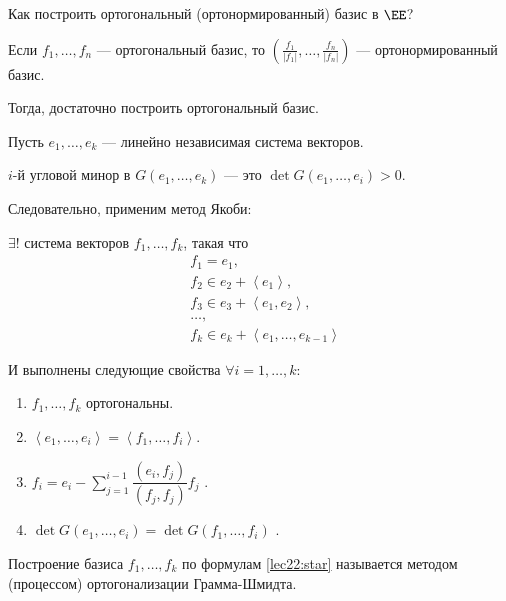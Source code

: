 Как построить ортогональный (ортонормированный) базис в $\EE$?

Если $f_1, \dots, f_n$ --- ортогональный базис, то $\left(\frac{f_1}{|f_1|}, \dots, \frac{f_n}{|f_n|}\right)$ --- ортонормированный базис.

Тогда, достаточно построить ортогональный базис.

Пусть $e_1, \dots, e_k$ --- линейно независимая система векторов.

$i$-й угловой минор в $G(e_1, \dots, e_k)$ --- это $\det G(e_1, \dots, e_i) > 0$.

\bigskip
Следовательно, применим метод Якоби:

$\exists!$ система векторов $f_1, \dots, f_k$, такая что 
\begin{align*}
&f_1 = e_1, \\
&f_2 \in e_2 + \left< e_1 \right>, \\
&f_3 \in e_3 + \left< e_1, e_2 \right>, \\
&\dots, \\
&f_k \in e_k + \left< e_1, \dots, e_{k - 1} \right>
\end{align*}


И выполнены следующие свойства $\forall i = 1, \dots, k$:

\begin{enumerate}[start=0,nosep]
\item $f_1, \dots, f_k$ ортогональны.
\item $\left< e_1, \dots, e_i \right> = \left< f_1, \dots, f_i \right>$.
    \label{lec22:gram-schmidt_second_property}
\item $f_i = e_i - \sum_{j = 1}^{i - 1} \dfrac{(e_i, f_j)}{(f_j, f_j)} f_j$ .
\item $\det G(e_1, \dots, e_i) = \det G(f_1, \dots, f_i)$ .
\end{enumerate}

\bigskip
Построение базиса $f_1, \dots, f_k$ по формулам \ref{lec22:star} называется методом (процессом) ортогонализации Грамма-Шмидта.
